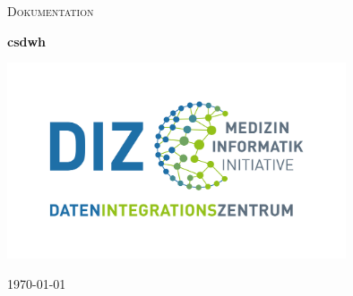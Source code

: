 \begin{titlepage}
	\thispagestyle{firstpage}
	
	\centering
	\vspace*{5cm}
	{\scshape\LARGE Dokumentation\par}
	\vspace{1.5cm}
	{\huge \bfseries \ac{csdwh}\par}
	\vspace{2cm}
    \includegraphics[width=10cm]{figures/diz.jpg}
	\vfill
	
	{\large \today\par}
\end{titlepage}